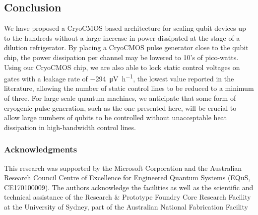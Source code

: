 \subsection{Conclusion}
We have proposed a CryoCMOS based architecture for scaling qubit devices up to the hundreds without a large increase in power dissipated at the \si{\mk} stage of a dilution refrigerator. By placing a CryoCMOS pulse generator close to the qubit chip, the power dissipation per channel may be lowered to 10's of pico-watts. Using our CryoCMOS chip, we are also able to lock static control voltages on gates with a leakage rate of \SI{-294}{\micro\volt\per\hour}, the lowest value reported in the literature, allowing the number of static control lines to be reduced to a minimum of three. For large scale quantum machines, we anticipate that some form of cryogenic pulse generation, such as the one presented here, will be crucial to allow large numbers of qubits to be controlled without unacceptable heat dissipation in high-bandwidth control lines.

\subsubsection{Acknowledgments}
This research was supported by the Microsoft Corporation and the Australian Research Council Centre of Excellence for Engineered Quantum Systems (EQuS, CE170100009). The authors acknowledge the facilities as well as the scientific and technical assistance of the Research \& Prototype Foundry Core Research Facility at the University of Sydney, part of the Australian National Fabrication Facility
